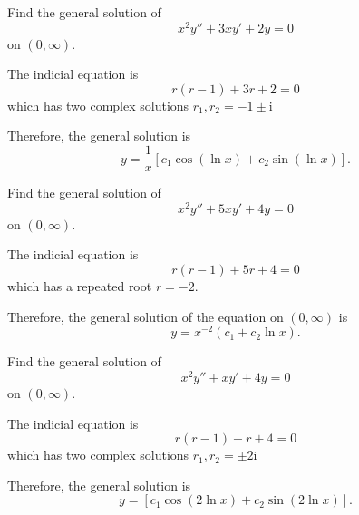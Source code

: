 \begin{example}
  Find the general solution of
  \[x^2y''+3xy'+2y=0\]
  on $(0,\infty)$.
\end{example}
\begin{solution}
The indicial equation is
\[r(r-1)+3r+2=0\]
which has two complex solutions
$r_1, r_2=-1\pm\mathrm{i}$

Therefore, the general solution is
\[y=\frac{1}{x}\left[c_1\cos(\ln x)+c_2\sin(\ln x)\right].\]
\end{solution}


\begin{exercise}
  Find the general solution of
\[x^2y''+5xy'+4y=0\]
on $(0,\infty)$.
\end{exercise}
\begin{exersol}
The indicial equation is
\[r(r-1)+5r+4=0\]
which has a repeated root $r=-2$.

Therefore, the general solution of the equation on $(0,\infty)$ is
\[y=x^{-2}(c_1+c_2 \ln x).\]
\end{exersol}

\begin{exercise}
  Find the general solution of
  \[x^2y''+xy'+4y=0\]
  on $(0,\infty)$.
\end{exercise}
\begin{exersol}
The indicial equation is
\[r(r-1)+r+4=0\]
which has two complex solutions
$r_1, r_2=\pm 2\mathrm{i}$

Therefore, the general solution is
\[y=\left[c_1\cos(2\ln x)+c_2\sin(2\ln x)\right].\]
\end{exersol}
